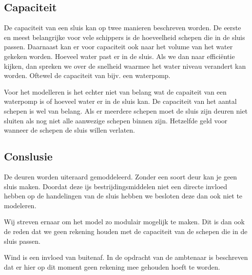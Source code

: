 \documentclass{article}
\begin{document}
\vskip0.5cm

\subsection{Capaciteit}
De capaciteit van een sluis kan op twee manieren beschreven worden. De eerste en meest belangrijke voor vele schippers is de hoeveelheid schepen die in de sluis passen.
Daarnaast kan er voor capaciteit ook naar het volume van het water gekeken worden. Hoeveel water past er in de sluis.
Als we dan naar efficiëntie kijken, dan spreken we over de snelheid waarmee het water niveau verandert kan worden. Oftewel de capaciteit van bijv. een waterpomp.

Voor het modelleren is het echter niet van belang wat de capaiteit van een waterpomp is of hoeveel water er in de sluis kan. De capaciteit van het aantal schepen is wel van belang. Als er meerdere schepen moet de sluis zijn deuren niet sluiten als nog niet alle aanwezige schepen binnen zijn. Hetzelfde geld voor wanneer de schepen de sluis willen verlaten.

\subsection{Conslusie}
De deuren worden uiteraard gemoddeleerd. Zonder een soort deur kan je geen sluis maken.
Doordat deze ijs bestrijdingsmiddelen niet een directe invloed hebben op de handelingen van de sluis hebben we besloten deze dan ook niet te modeleren.

Wij streven ernaar om het model zo modulair mogelijk te maken. Dit is dan ook de reden dat we geen rekening houden met de capaciteit van de schepen die in de sluis passen.

Wind is een invloed van buitenaf. In de opdracht van de ambtenaar is beschreven dat er hier op dit moment geen rekening mee gehouden hoeft te worden.
\clearpage
\end{document}
